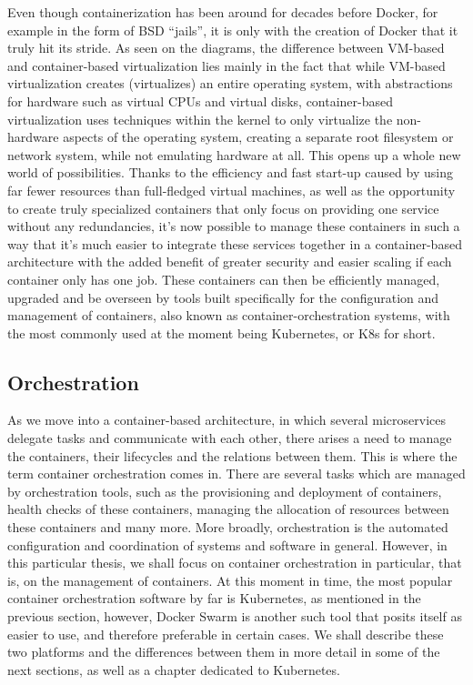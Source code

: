 \documentclass[thesis=B,english]{FITthesis}[2019/12/23]
\begin{document}
Even though containerization has been around for decades before Docker, for example in the form of BSD “jails”, it is only with the creation of Docker that it truly hit its stride. As seen on the diagrams, the difference between VM-based and container-based virtualization lies mainly in the fact that while VM-based virtualization creates (virtualizes) an entire operating system, with abstractions for hardware such as virtual CPUs and virtual disks, container-based virtualization uses techniques within the kernel to only virtualize the non-hardware aspects of the operating system, creating a separate root filesystem or network system, while not emulating hardware at all.
\newline
This opens up a whole new world of possibilities. Thanks to the efficiency and fast start-up caused by using far fewer resources than full-fledged virtual machines, as well as the opportunity to create truly specialized containers that only focus on providing one service without any redundancies, it’s now possible to manage these containers in such a way that it’s much easier to integrate these services together in a container-based architecture with the added benefit of greater security and easier scaling if each container only has one job.
\newline
These containers can then be efficiently managed, upgraded and be overseen by tools built specifically for the configuration and management of containers, also known as container-orchestration systems, with the most commonly used at the moment being Kubernetes, or K8s for short.


\subsection{Orchestration}

As we move into a container-based architecture, in which several microservices delegate tasks and communicate with each other, there arises a need to manage the containers, their lifecycles and the relations between them. This is where the term container orchestration comes in.
\newline
There are several tasks which are managed by orchestration tools, such as the provisioning and deployment of containers, health checks of these containers, managing the allocation of resources between these containers and many more. 
\newline
More broadly, orchestration is the automated configuration and coordination of systems and software in general. However, in this particular thesis, we shall focus on container orchestration in particular, that is, on the management of containers.
\newline
At this moment in time, the most popular container orchestration software by far is Kubernetes, as mentioned in the previous section, however, Docker Swarm is another such tool that posits itself as easier to use, and therefore preferable in certain cases. We shall describe these two platforms and the differences between them in more detail in some of the next sections, as well as a chapter dedicated to Kubernetes.
\end{document}

